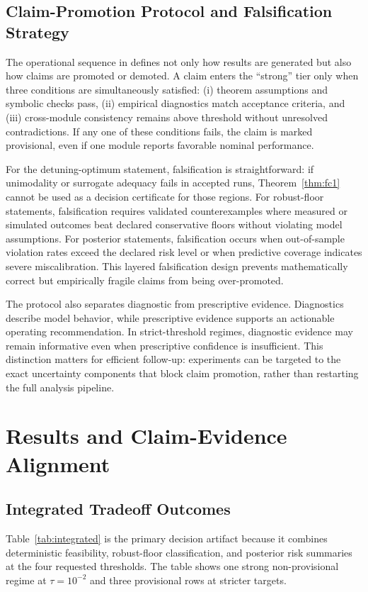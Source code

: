 \documentclass{article} %
\begin{document}
\subsection{Claim-Promotion Protocol and Falsification Strategy}
The operational sequence in  defines not only how results are generated but also how claims are promoted or demoted. A claim enters the ``strong'' tier only when three conditions are simultaneously satisfied: (i) theorem assumptions and symbolic checks pass, (ii) empirical diagnostics match acceptance criteria, and (iii) cross-module consistency remains above threshold without unresolved contradictions. If any one of these conditions fails, the claim is marked provisional, even if one module reports favorable nominal performance.

For the detuning-optimum statement, falsification is straightforward: if unimodality or surrogate adequacy fails in accepted runs, Theorem~\ref{thm:fc1} cannot be used as a decision certificate for those regions. For robust-floor statements, falsification requires validated counterexamples where measured or simulated outcomes beat declared conservative floors without violating model assumptions. For posterior statements, falsification occurs when out-of-sample violation rates exceed the declared risk level or when predictive coverage indicates severe miscalibration. This layered falsification design prevents mathematically correct but empirically fragile claims from being over-promoted.

The protocol also separates diagnostic from prescriptive evidence. Diagnostics describe model behavior, while prescriptive evidence supports an actionable operating recommendation. In strict-threshold regimes, diagnostic evidence may remain informative even when prescriptive confidence is insufficient. This distinction matters for efficient follow-up: experiments can be targeted to the exact uncertainty components that block claim promotion, rather than restarting the full analysis pipeline.

\section{Results and Claim-Evidence Alignment}
\label{sec:results}
\subsection{Integrated Tradeoff Outcomes}
Table~\ref{tab:integrated} is the primary decision artifact because it combines deterministic feasibility, robust-floor classification, and posterior risk summaries at the four requested thresholds. The table shows one strong non-provisional regime at $\tau=10^{-2}$ and three provisional rows at stricter targets.
\end{document}
